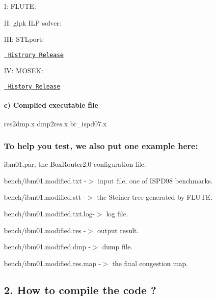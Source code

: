 \begin{DoxyItemize}
\item I\+: F\+L\+U\+TE\+:
\item II\+: glpk I\+LP solver\+:
\item I\+II\+: S\+T\+Lport\+:

\href{https://sourceforge.net/projects/stlport/files/STLport/}{\texttt{ Histrory Release}}
\item IV\+: M\+O\+S\+EK\+:

\href{https://www.mosek.com/downloads/list/4/}{\texttt{ History Release}}
\end{DoxyItemize}

\paragraph*{c) Complied executable file}

\begin{DoxyVerb}res2dmp.x dmp2res.x br_ispd07.x
\end{DoxyVerb}


\subsubsection*{To help you test, we also put one example here\+:}

\begin{DoxyVerb}ibm01.par, the BoxRouter2.0 configuration file.
\end{DoxyVerb}



\begin{DoxyItemize}
\item bench/ibm01.\+modified.\+txt -\/$>$ input file, one of I\+S\+P\+D98 benchmarks.
\item bench/ibm01.\+modified.\+stt -\/$>$ the Steiner tree generated by F\+L\+U\+TE.
\item bench/ibm01.\+modified.\+txt.\+log-\/$>$ log file.
\item bench/ibm01.\+modified.\+res -\/$>$ output result.
\item bench/ibm01.\+modified.\+dmp -\/$>$ dump file.
\item bench/ibm01.\+modified.\+res.\+map -\/$>$ the final congestion map.
\end{DoxyItemize}

\subsection*{2. How to compile the code ?}

